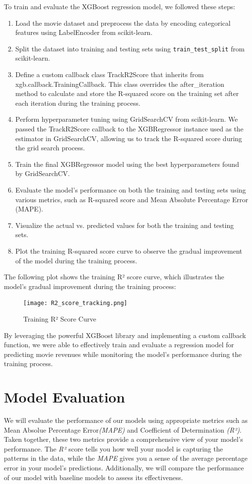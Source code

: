 \documentclass[conference]{IEEEtran}
\begin{document}
        To train and evaluate the XGBoost regression model, we followed these steps:
        \begin{enumerate}
        \item Load the movie dataset and preprocess the data by encoding categorical features using LabelEncoder from scikit-learn.
        \item Split the dataset into training and testing sets using \texttt{train\_test\_split} from scikit-learn.
        \item Define a custom callback class TrackR2Score that inherits from xgb.callback.TrainingCallback. This class overrides the after\_iteration method to calculate and store the R-squared score on the training set after each iteration during the training process.
        \item Perform hyperparameter tuning using GridSearchCV from scikit-learn. We passed the TrackR2Score callback to the XGBRegressor instance used as the estimator in GridSearchCV, allowing us to track the R-squared score during the grid search process.
        \item Train the final XGBRegressor model using the best hyperparameters found by GridSearchCV.
        \item Evaluate the model's performance on both the training and testing sets using various metrics, such as R-squared score and Mean Absolute Percentage Error (MAPE).
        \item Visualize the actual vs. predicted values for both the training and testing sets.
        \item Plot the training R-squared score curve to observe the gradual improvement of the model during the training process.
        \end{enumerate}
    The following plot shows the training R² score curve, which illustrates the model's gradual improvement during the training process:
    \begin{figure}[h]
        \centering
        \texttt{[image: R2\_score\_tracking.png]}
        \caption{Training R² Score Curve}
        \label{fig:xg_boost_track}
    \end{figure}
    By leveraging the powerful XGBoost library and implementing a custom callback function, we were able to effectively train and evaluate a regression model for predicting movie revenues while monitoring the model's performance during the training process.

    
\section{Model Evaluation}
    We will evaluate the performance of our models using appropriate metrics such as Mean Absolue Percentage Error\textit{(MAPE)} and Coefficient of Determination \textit{(R²)}. Taken together, these two metrics provide a comprehensive view of your model’s performance. The \textit{R²} score tells you how well your model is capturing the patterns in the data, while the \textit{MAPE} gives you a sense of the average percentage error in your model’s predictions. Additionally, we will compare the performance of our model with baseline models to assess its effectiveness.
    
\end{document}
